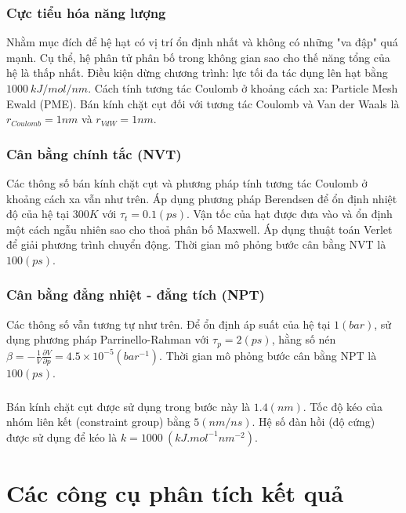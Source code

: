 \documentclass[12pt,a4paper,reqno, oneside]{book}
\begin{document}
\subsubsection{Cực tiểu hóa năng lượng}
Nhằm mục đích để hệ hạt có vị trí ổn định nhất và không có những "va đập" quá mạnh. Cụ thể, hệ phân tử phân bố trong không gian sao cho thế năng tổng của hệ là thấp nhất. Điều kiện dừng chương trình: lực tối đa tác dụng lên hạt bằng $1000\ kJ/mol/nm$. Cách tính tương tác Coulomb ở khoảng cách xa: Particle Mesh Ewald (PME). Bán kính chặt cụt đối với tương tác Coulomb và Van der Waals là $r_{Coulomb}=1nm$ và $r_{VdW}=1nm$.
\label{rcutoff}
\subsubsection{Cân bằng chính tắc (NVT)}
Các thông số bán kính chặt cụt và phương pháp tính tương tác Coulomb ở khoảng cách xa vẫn như trên. Áp dụng phương pháp Berendsen để ổn định nhiệt độ của hệ tại $300K$ với $\tau_{t}=0.1\left(ps\right)$. Vận tốc của hạt được đưa vào và ổn định một cách ngẫu nhiên sao cho thoả phân bố Maxwell. Áp dụng thuật toán Verlet để giải phương trình chuyển động. Thời gian mô phỏng bước cân bằng NVT là $100\left(ps\right)$.
\subsubsection{Cân bằng đẳng nhiệt - đẳng tích (NPT)}
Các thông số vẫn tương tự như trên. Để ổn định áp suất của hệ tại $1 \left(bar\right)$, sử dụng phương pháp Parrinello-Rahman với $\tau_{p}=2\left(ps\right)$, hằng số nén $\beta=-\frac{1}{V}\frac{\partial V}{\partial p} = 4.5\times 10^{-5}\left(bar^{-1}\right)$. Thời gian mô phỏng bước cân bằng NPT là $100\left(ps\right)$.
\subsubsection{}
Bán kính chặt cụt được sử dụng trong bước này là $1.4\left(nm\right)$. Tốc độ kéo của nhóm liên kết (constraint group) bằng $5\left(nm/ns\right)$. Hệ số đàn hồi (độ cứng) được sử dụng để kéo là $k = 1000\ \left( kJ . mol^ {-1} nm^ {-2} \right)$.
\section{Các công cụ phân tích kết quả}
\end{document}
